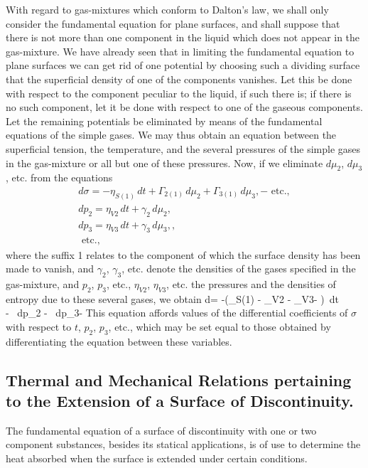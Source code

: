 \documentclass[12pt]{memoir}
\begin{document}
{With regard to gas-mixtures which conform to Dalton's law, we shall only consider the fundamental equation for plane surfaces, and shall suppose that there is not more than one component in the liquid which does not appear in the gas-mixture. We have already seen that in limiting the fundamental equation to plane surfaces we can get rid of one potential by choosing such a dividing surface that the superficial density of one of the components vanishes. Let this be done with respect to the component peculiar to the liquid, if such there is; if there is no such component, let it be done with respect to one of the gaseous components. Let the remaining potentials be eliminated by means of the fundamental equations of the simple gases. We may thus obtain an equation between the superficial tension, the temperature, and the several pressures of the simple gases in the gas-mixture or all but one of these pressures. Now, if we eliminate $d\mu_2$, $d\mu_3$, etc. from the equations
\begin{gather*}
d\sigma =  -\eta_{S(1)} \,dt + \Gamma_{2(1)} \, d\mu_2 +\Gamma_{3(1)} \, d\mu_3,- \text{ etc.}, \\
dp_2 = \eta_{V2}\, dt+ \gamma_2\, d\mu_2, \\
dp_3 = \eta_{V3}\, dt+ \gamma_3\, d\mu_3,, \\
\text{ etc.}, \end{gather*}
where the suffix 1 relates to the component of which the surface density has been made to vanish, and $\gamma_2$, $\gamma_3$, etc. denote the densities of the gases specified in the gas-mixture, and $p_2$, $p_3$, etc., $\eta_{V2}$, $\eta_{V3}$, etc. the pressures and the densities of entropy due to these several gases, we obtain
\eqs d\sigma= -\left(\eta_{S(1)} - \eta_{V2}  - \eta_{V3}- \right)\, dt \\
- \, dp_2 - \, dp_3-   \label{585} \eqe
This equation affords values of the differential coefficients of $\sigma$ with respect to $t$, $p_2$, $p_3$, etc., which may be set equal to those obtained by differentiating the equation between these variables.
\subsection{Thermal and Mechanical Relations pertaining to the Extension of a Surface of Discontinuity.}
The fundamental equation of a surface of discontinuity with one or two component substances, besides its statical applications, is of use to determine the heat absorbed when the surface is extended under certain conditions.


}
\end{document}
